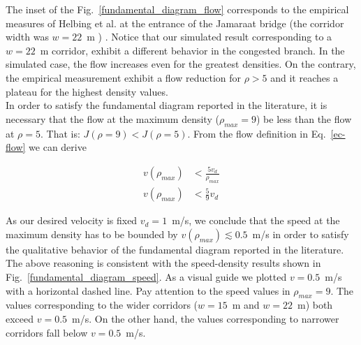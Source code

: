 The inset of the Fig.~\ref{fundamental_diagram_flow} corresponds to the empirical measures of Helbing et al. at the entrance of the Jamaraat bridge (the corridor width was $w=22$~m ) \cite{helbing3}. Notice that our simulated result corresponding to a $w=22$~m corridor, exhibit a different behavior in the congested branch. In the simulated case, the flow increases even for the greatest densities. On the contrary, the empirical measurement exhibit a flow reduction for $\rho > 5$ and it reaches a plateau for the highest density values.  \\

In order to satisfy the fundamental diagram reported in the literature, it is necessary that the flow at the maximum density ($\rho_{max} = 9$) be less than the flow at $\rho = 5$. That is:  $J(\rho = 9) < J(\rho = 5)$. From the flow definition in Eq.~\ref{ec-flow} we can derive

\begin{align*} 
v(\rho_{max}) &< \frac{5v_d}{\rho_{max}} \\
v(\rho_{max}) &< \frac{5}{9} v_d
\end{align*}

As our desired velocity is fixed $v_d = 1$~m/s, we conclude that the speed at the maximum density has to be bounded by $v(\rho_{max}) \lesssim  0.5$~m/s in order to satisfy the qualitative behavior of the fundamental diagram reported in the literature.\\

The above reasoning is consistent with the speed-density results shown in Fig.~\ref{fundamental_diagram_speed}. As a visual guide we plotted $v=0.5$~m/s with a horizontal dashed line. Pay attention to the speed values in $\rho_{max} = 9$. The values corresponding to the wider corridors ($w=15$~m and $w=22$~m) both exceed $v=0.5$~m/s. On the other hand, the values corresponding to narrower corridors fall below $v=0.5$~m/s. \\

